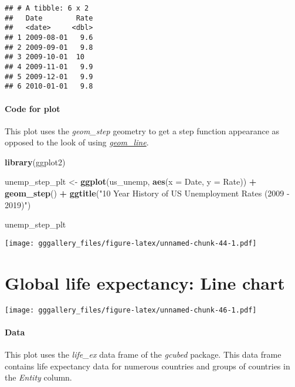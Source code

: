 \documentclass[]{book}
\newenvironment{Shaded}{\begin{snugshade}}{\end{snugshade}}
\newcommand{\DataTypeTok}[1]{\textcolor[rgb]{0.13,0.29,0.53}{#1}}
\newcommand{\KeywordTok}[1]{\textcolor[rgb]{0.13,0.29,0.53}{\textbf{#1}}}
\newcommand{\NormalTok}[1]{#1}
\newcommand{\OperatorTok}[1]{\textcolor[rgb]{0.81,0.36,0.00}{\textbf{#1}}}
\newcommand{\StringTok}[1]{\textcolor[rgb]{0.31,0.60,0.02}{#1}}
\begin{document}
\begin{verbatim}
## # A tibble: 6 x 2
##   Date        Rate
##   <date>     <dbl>
## 1 2009-08-01   9.6
## 2 2009-09-01   9.8
## 3 2009-10-01  10  
## 4 2009-11-01   9.9
## 5 2009-12-01   9.9
## 6 2010-01-01   9.8
\end{verbatim}

\hypertarget{unemppppcode}{%
\subsubsection*{Code for plot}\label{unemppppcode}}

This plot uses the \emph{geom\_step} geometry to get a step function appearance as opposed to the look of using \protect\hyperlink{unemp1code}{\emph{geom\_line}}.

\begin{Shaded}
\begin{Highlighting}[]
\KeywordTok{library}\NormalTok{(ggplot2)}

\NormalTok{unemp_step_plt <-}\StringTok{ }\KeywordTok{ggplot}\NormalTok{(us_unemp, }\KeywordTok{aes}\NormalTok{(}\DataTypeTok{x =}\NormalTok{ Date, }\DataTypeTok{y =}\NormalTok{ Rate)) }\OperatorTok{+}\StringTok{ }\KeywordTok{geom_step}\NormalTok{() }\OperatorTok{+}\StringTok{ }
\StringTok{  }\KeywordTok{ggtitle}\NormalTok{(}\StringTok{"10 Year History of US Unemployment Rates (2009 - 2019)"}\NormalTok{)}
  
  
\NormalTok{unemp_step_plt}
\end{Highlighting}
\end{Shaded}

\texttt{[image: gggallery\_files/figure-latex/unnamed-chunk-44-1.pdf]}

\hypertarget{lex}{%
\chapter*{Global life expectancy: Line chart}\label{lex}}

\texttt{[image: gggallery\_files/figure-latex/unnamed-chunk-46-1.pdf]}

\hypertarget{lexdata}{%
\subsubsection*{Data}\label{lexdata}}

This plot uses the \emph{life\_ex} data frame of the \emph{gcubed} package. This data frame contains life expectancy data for numerous countries and groups of countries in the \emph{Entity} column.
\end{document}
